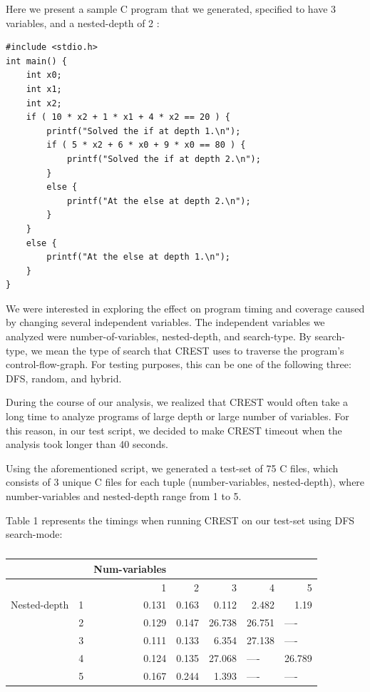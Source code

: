 \documentclass[oribibl]{llncs}
\begin{document}
Here we present a sample C program that we generated, specified to have 3 variables, and a nested-depth of 2 :

\begin{verbatim}
#include <stdio.h>
int main() {
    int x0;
    int x1;
    int x2;
    if ( 10 * x2 + 1 * x1 + 4 * x2 == 20 ) {
        printf("Solved the if at depth 1.\n");
        if ( 5 * x2 + 6 * x0 + 9 * x0 == 80 ) {
            printf("Solved the if at depth 2.\n");
        }
        else {
            printf("At the else at depth 2.\n");
        }
    }
    else {
        printf("At the else at depth 1.\n");
    }
}
\end{verbatim}

We were interested in exploring the effect on program timing and coverage caused by changing several independent variables. The independent variables we analyzed were number-of-variables, nested-depth, and search-type. By search-type, we mean the type of search that CREST uses to traverse the program's control-flow-graph. For testing purposes, this can be one of the following three: DFS, random, and hybrid.

During the course of our analysis, we realized that CREST would often take a long time to analyze programs of large depth or large number of variables. For this reason, in our test script, we decided to make CREST timeout when the analysis took longer than 40 seconds.

Using the aforementioned script, we generated a test-set of 75 C files, which consists of 3 unique C files for each tuple (number-variables, nested-depth), where number-variables and nested-depth range from 1 to 5.



Table 1 represents the timings when running CREST on our test-set using DFS search-mode:

\begin{table}[htbp]
\caption{}
\begin{tabular}{|l|r|r|r|r|r|l|}
\hline
 & \multicolumn{1}{l|}{} & \multicolumn{1}{l|}{Num-variables} & \multicolumn{1}{l|}{} & \multicolumn{1}{l|}{} & \multicolumn{1}{l|}{} &  \\ \hline
 & \multicolumn{1}{l|}{} & 1 & 2 & 3 & 4 & \multicolumn{1}{r|}{5} \\ \hline
Nested-depth & 1 & 0.131 & 0.163 & 0.112 & 2.482 & \multicolumn{1}{r|}{1.19} \\ \hline
 & 2 & 0.129 & 0.147 & 26.738 & 26.751 & ---- \\ \hline
 & 3 & 0.111 & 0.133 & 6.354 & 27.138 & ---- \\ \hline
 & 4 & 0.124 & 0.135 & 27.068 & \multicolumn{1}{l|}{----} & \multicolumn{1}{r|}{26.789} \\ \hline
 & 5 & 0.167 & 0.244 & 1.393 & \multicolumn{1}{l|}{----} & ---- \\ \hline
\end{tabular}
\label{DFS timings (in seconds)}
\end{table}
\end{document}
